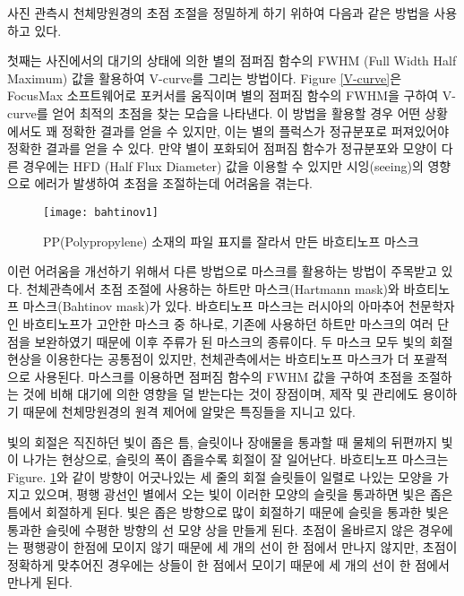 사진 관측시 천체망원경의 초점 조절을 정밀하게 하기 위하여 다음과 같은 방법을 사용하고 있다. 

첫째는 사진에서의 대기의 상태에 의한 별의 점퍼짐 함수의 FWHM (Full Width Half Maximum) 값을 활용하여 V-curve를 그리는 방법이다. \textrm{Figure} \ref{V-curve}은 FocusMax 소프트웨어로 포커서를 움직이며 별의 점퍼짐 함수의 FWHM을 구하여 V-curve를 얻어 최적의 초점을 찾는 모습을 나타낸다. 이 방법을 활용할 경우 어떤 상황에서도 꽤 정확한 결과를 얻을 수 있지만, 이는 별의 플럭스가 정규분포로 퍼져있어야 정확한 결과를 얻을 수 있다. 만약 별이 포화되어 점퍼짐 함수가 정규분포와 모양이 다른 경우에는 HFD (Half Flux Diameter) 값을 이용할 수 있지만 시잉(seeing)의 영향으로 에러가 발생하여 초점을 조절하는데 어려움을 겪는다. 

\begin{figure}[h]
	\begin{center}
		\texttt{[image: bahtinov1]}
	\end{center}
	\caption{PP(Polypropylene) 소재의 파일 표지를 잘라서 만든 바흐티노프 마스크}
	\label{bahtinov}
\end{figure}

이런 어려움을 개선하기 위해서 다른 방법으로 마스크를 활용하는 방법이 주목받고 있다. 천체관측에서 초점 조절에 사용하는 하트만 마스크(Hartmann mask)와 바흐티노프 마스크(Bahtinov mask)가 있다. 바흐티노프 마스크는 러시아의 아마추어 천문학자인 바흐티노프가 고안한 마스크 중 하나로, 기존에 사용하던 하트만 마스크의 여러 단점을 보완하였기 때문에 이후 주류가 된 마스크의 종류이다. 두 마스크 모두 빛의 회절 현상을 이용한다는 공통점이 있지만, 천체관측에서는 바흐티노프 마스크가 더 포괄적으로 사용된다. 마스크를 이용하면 점퍼짐 함수의 FWHM 값을 구하여 초점을 조절하는 것에 비해 대기에 의한 영향을 덜 받는다는 것이 장점이며, 제작 및 관리에도 용이하기 때문에 천체망원경의 원격 제어에 알맞은 특징들을 지니고 있다. 

빛의 회절은 직진하던 빛이 좁은 틈, 슬릿이나 장애물을 통과할 때 물체의 뒤편까지 빛이 나가는 현상으로, 슬릿의 폭이 좁을수록 회절이 잘 일어난다. 바흐티노프 마스크는 Figure. \ref{bahtinov}와 같이 방향이 어긋나있는 세 줄의 회절 슬릿들이 일렬로 나있는 모양을 가지고 있으며, 평행 광선인 별에서 오는 빛이 이러한 모양의 슬릿을 통과하면 빛은 좁은 틈에서 회절하게 된다. 빛은 좁은 방향으로 많이 회절하기 때문에 슬릿을 통과한 빛은 통과한 슬릿에 수평한 방향의 선 모양 상을 만들게 된다. 초점이 올바르지 않은 경우에는 평행광이 한점에 모이지 않기 때문에 세 개의 선이 한 점에서 만나지 않지만, 초점이 정확하게 맞추어진 경우에는 상들이 한 점에서 모이기 때문에 세 개의 선이 한 점에서 만나게 된다.

